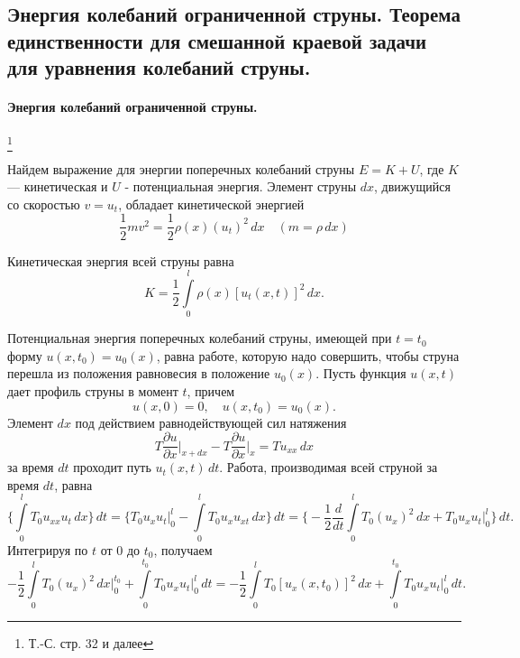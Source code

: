\subsection{Энергия колебаний ограниченной струны. Теорема единственности для смешанной краевой задачи для уравнения колебаний струны.}

\paragraph{Энергия колебаний ограниченной струны.}\footnote{Т.-С. стр. 32 и далее}

Найдем выражение для энергии поперечных колебаний струны $E = K + U$, где $K$ --- кинетическая и $U$ - потенциальная энергия. Элемент струны $dx$, движущийся со скоростью $v = u_t$, обладает кинетической энергией 
\begin{equation*}
	\frac{1}{2} m v^2 = \frac{1}{2} \rho(x) (u_t)^2 \, dx \quad (m = \rho \, dx)
\end{equation*}

Кинетическая энергия всей струны равна 
\begin{equation}
	K = \frac{1}{2} \int \limits_{0}^{l} \rho(x) [u_t(x, t)]^2 \, dx.
\end{equation}

Потенциальная энергия поперечных колебаний струны, имеющей при $t = t_0$ форму $u(x, t_0) = u_0(x)$, равна работе, которую надо совершить, чтобы струна перешла из положения равновесия в положение $u_0(x)$. Пусть функция $u(x, t)$ дает профиль струны в момент $t$, причем
\begin{equation*}
	u(x, 0) = 0, \quad u(x, t_0) = u_0(x).
\end{equation*}
Элемент $dx$ под действием равнодействующей сил натяжения 
\begin{equation*}
	T \frac{\partial u}{\partial x} \Big|_{x + dx} - T \frac{\partial u}{\partial x} \Big|_{x} = T u_{xx} \, dx
\end{equation*}
за время $dt$ проходит путь $u_t(x, t) \, dt$. Работа, производимая всей струной за время $dt$, равна
\begin{equation*}
	\Bigg\{\int \limits_{0}^{l} T_0 u_{xx} u_t \, dx \Bigg\} \, dt = \Bigg\{T_0 u_x u_t \Big|_{0}^{l} - \int \limits_{0}^{l} T_0 u_x u_{xt} \, dx \Bigg\} \, dt =  \Bigg\{-\frac{1}{2} \frac{d}{dt} \int \limits_{0}^{l} T_0 (u_x)^2 \, dx + T_0 u_x u_t \Big|_{0}^{l}\Bigg\} \, dt.
\end{equation*}
Интегрируя по $t$ от $0$ до $t_0$, получаем
\begin{equation*}
	-\frac{1}{2} \int \limits_{0}^{l} T_0(u_x)^2 \, dx \Big|_{0}^{t_0} + \int \limits_{0}^{t_0} T_0 u_x u_t \Big|_{0}^{l} \, dt = -\frac{1}{2} \int \limits_{0}^{l} T_0 [u_x(x, t_0)]^2 \, dx + \int \limits_{0}^{t_0} T_0 u_x u_t \Big|_{0}^{l} \, dt.
\end{equation*}

